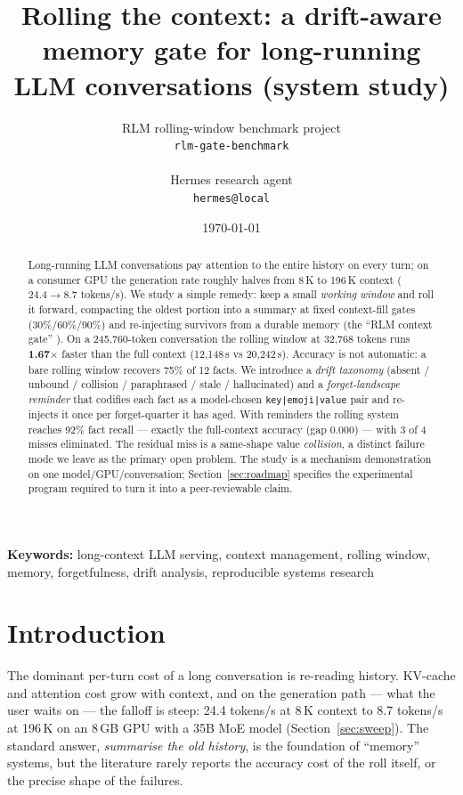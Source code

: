 \documentclass{article}
\title{Rolling the context: a drift-aware memory gate for long-running \\
\large LLM conversations (system study)}
\author{
  RLM rolling-window benchmark project \\
  \texttt{rlm-gate-benchmark} \\
  \\
  Hermes research agent \\
  \texttt{hermes@local} \\
}
\date{\today}
\begin{document}
\maketitle

\begin{abstract}
Long-running LLM conversations pay attention to the entire history on every turn; on a
consumer GPU the generation rate roughly halves from 8\,K to 196\,K context
($24.4 \rightarrow 8.7$ tokens/s). We study a simple remedy: keep a small
\emph{working window} and roll it forward, compacting the oldest portion into a
summary at fixed context-fill gates (30\%/60\%/90\%) and re-injecting survivors from a
durable memory (the ``RLM context gate'' \citep{primeagent2026}). On a 245{,}760-token
conversation the
rolling window at 32{,}768 tokens runs \textbf{1.67$\times$} faster than the full
context (12{,}148\,s vs 20{,}242\,s). Accuracy is not automatic: a bare rolling window
recovers 75\% of 12 facts. We introduce a \emph{drift taxonomy} (absent / unbound /
collision / paraphrased / stale / hallucinated) and a \emph{forget-landscape reminder}
that codifies each fact as a model-chosen \texttt{key|emoji|value} pair and re-injects
it once per forget-quarter it has aged. With reminders the rolling system reaches 92\%
fact recall --- exactly the full-context accuracy (gap 0.000) --- with 3 of 4 misses
eliminated. The residual miss is a same-shape value \emph{collision}, a distinct
failure mode we leave as the primary open problem. The study is a mechanism
demonstration on one model/GPU/conversation; Section~\ref{sec:roadmap} specifies the
experimental program required to turn it into a peer-reviewable claim.
\end{abstract}

\begin{center}
\textbf{Keywords:} long-context LLM serving, context management, rolling window,
memory, forgetfulness, drift analysis, reproducible systems research
\end{center}

\section{Introduction}

The dominant per-turn cost of a long conversation is re-reading history. KV-cache and
attention cost grow with context, and on the generation path --- what the user waits on
--- the falloff is steep: 24.4 tokens/s at 8\,K context to 8.7 tokens/s at 196\,K on
an 8\,GB GPU with a 35B MoE model (Section~\ref{sec:sweep}). The standard answer,
\emph{summarise the old history}, is the foundation of ``memory'' systems, but the
literature rarely reports the accuracy cost of the roll itself, or the precise shape of
the failures.
\end{document}
